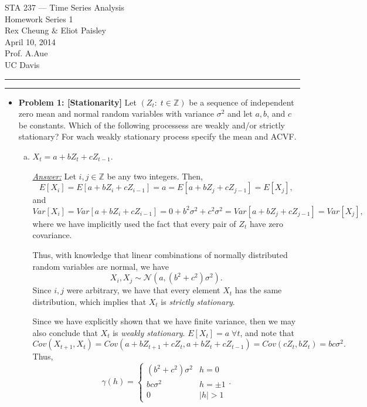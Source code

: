 \documentclass[a4paper, 11pt]{article}
\begin{document}
\flushright
\begin{center}
\Large
STA 237  --- Time Series Analysis\\ Homework Series 1 \\ Rex Cheung  $\&$ Eliot Paisley \\ April 10, 2014 \\
\large  Prof. A.Aue \\ UC Davis
\end{center}

\flushleft 
\hrule \hrule 
\vspace{0.2in}
\begin{itemize}

	\item \textbf{Problem 1: [Stationarity]} Let $(Z_t: \; t \in \mathbb{Z})$ be a sequence of independent zero mean and normal random variables with variance $\sigma^2$ and let $a, b$, and $c$ be constants. Which of the following processess are weakly and/or strictly stationary? For wach weakly stationary process specify the mean and ACVF. 
	
	
	\begin{enumerate}[(a)]
		\item $X_t = a + bZ_t + cZ_{t-1}$. \newline 
		
			\underline{\emph{Answer:}} Let $i,j \in \mathbb{Z}$ be any two integers. Then, 
			$$E[X_i] = E[a + bZ_i + cZ_{i-1}] = a = E[a + bZ_j + cZ_{j-1}] = E[X_j],$$
			and
			$$Var[X_i] = Var[a + bZ_i + cZ_{i-1}] = 0 + b^2\sigma^2 + c^2\sigma^2 = Var[a + bZ_j + cZ_{j-1}] = Var[X_j], $$
where we have implicitly used the fact that every pair of $Z_t$ have zero covariance. \newline 

Thus, with knowledge that linear combinations of normally distributed random variables are normal, we have 
$$X_i,X_j \sim \mathcal{N}(a,(b^2+c^2)\sigma^2) .$$
Since $i,j$ were arbitrary, we have that every element $X_t$ has the same distribution, which implies that $X_t$ is \emph{strictly stationary}. \newline 

Since we have explicitly shown that we have finite variance, then we may also conclude that $X_t$ is \emph{weakly stationary}. $E[X_t] = a \; \forall t$, and note that 
$$Cov(X_{t+1},X_t) = Cov(a + bZ_{t+1} + cZ_{t}, a + bZ_t + cZ_{t-1} ) = Cov(cZ_t,bZ_t) = bc\sigma^2.  $$
Thus, 
$$\gamma(h) = \left\{\begin{array}{cc} (b^2+c^2)\sigma^2 & h = 0 \\ bc\sigma^2 & h=\pm 1 \\ 0 & |h|>1 \end{array}\right. .$$


\end{enumerate}
\end{itemize}
\end{document}

